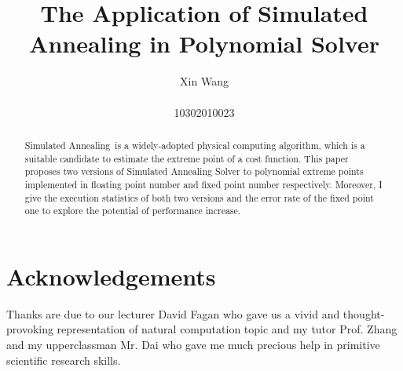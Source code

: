 \documentclass[twocolumn]{article}
\newcommand{\SA}{Simulated Annealing~}
\begin{document}
\title{{\bf The Application of Simulated Annealing in Polynomial Solver}\\ }

\author{Xin Wang\\ \vspace{0.5cm}\\
 10302010023}

\date{}
\maketitle
\begin{abstract}
\SA is a widely-adopted physical computing algorithm, which is a suitable candidate to estimate the extreme point of a cost function. This paper proposes two versions of Simulated Annealing Solver to polynomial extreme points implemented in floating point number and fixed point number respectively. Moreover, I give the execution statistics of both two versions and the error rate of the fixed point one to explore the potential of performance increase.
\end{abstract}














\section{Acknowledgements}
Thanks are due to our lecturer David Fagan who gave us a vivid and thought-provoking representation of natural computation topic and my tutor Prof. Zhang and my upperclassman Mr. Dai who gave me much precious help in primitive scientific research skills.



\end{document}
